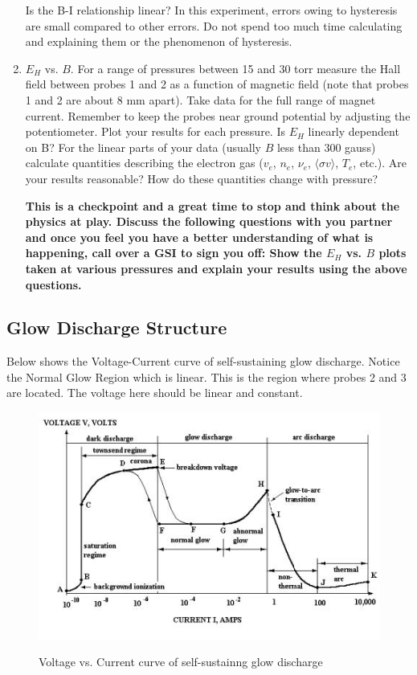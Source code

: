 \documentclass{../lab}
\begin{document}
\begin{enumerate}
    Is the B-I relationship linear? In this experiment, errors owing to hysteresis are small compared to other errors. Do not spend too much time calculating and explaining them or the phenomenon of hysteresis.
    
\newpage

    \item $E_H$ vs. $B$. For a range of pressures between 15 and 30 torr measure the Hall field between probes 1 and 2 as a function of magnetic field (note that probes 1 and 2 are about 8 mm apart). Take data for the full range of magnet current. Remember to keep the probes near ground potential by adjusting the potentiometer. Plot your results for each pressure. Is $E_H$ linearly dependent on B? For the linear parts of your data (usually $B$ less than 300 gauss) calculate quantities describing the electron gas ($v_e$, $n_e$, $\nu_e$, $\langle \sigma v \rangle$, $T_e$, etc.). Are your results reasonable? How do these quantities change with pressure?

\textbf{This is a checkpoint and a great time to stop and think about the physics at play. Discuss the following questions with you partner and once you feel you have a better understanding of what is happening, call over a GSI to sign you off:
Show the $E_H$ vs. $B$ plots taken at various pressures and explain your results using the above questions.}

\end{enumerate}

\subsection{Glow Discharge Structure}

Below shows the Voltage-Current curve of self-sustaining glow discharge. Notice the Normal Glow Region which is linear. This is the region where probes 2 and 3 are located. The voltage here should be linear and constant.

\begin{figure}[h]
    \centering
    \href{http://experimentationlab.berkeley.edu/sites/default/files/images/DischargeStructure.jpg}{\includegraphics[width=0.8\linewidth]{images/DischargeStructure.jpg}}
    \caption{Voltage vs. Current curve of self-sustainng glow discharge}
\end{figure}
\end{document}
